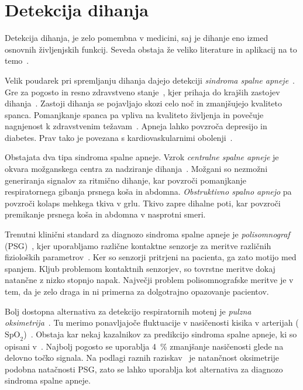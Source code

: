 \section{Detekcija dihanja}\label{sec:detekcija-dihanja}
Detekcija dihanja, je zelo pomembna v medicini, saj je dihanje eno izmed osnovnih življenjskih funkcij. Seveda obstaja že veliko literature in aplikacij na to temo~\cite{sathyanarayana2015vision}.

Velik poudarek pri spremljanju dihanja dajejo detekciji  \emph{sindroma spalne apneje}~\cite{sathyanarayana2015vision}. Gre za pogosto in resno zdravstveno stanje~\cite{wang2006vision}, kjer prihaja do krajših zastojev dihanja~\cite{flemons2002obstructive}. Zastoji dihanja se pojavljajo skozi celo noč in zmanjšujejo kvaliteto spanca. Pomanjkanje spanca pa vpliva na kvaliteto življenja in povečuje nagnjenost k zdravstvenim težavam~\cite{malhotra2002obstructive}. Apneja lahko povzroča depresijo in diabetes. Prav tako je povezana s kardiovaskularnimi obolenji~\cite{takemura2005respiratory}.

Obstajata dva tipa sindroma spalne apneje. Vzrok \emph{centralne spalne apneje} je okvara možganskega centra za nadziranje dihanja~\cite{javaheri2010central}. Možgani so nezmožni generiranja signalov za ritmično dihanje, kar povzroči pomanjkanje respiratornega gibanja prsnega koša in abdomna. \emph{Obstruktivno spalno apnejo} pa povzroči kolaps mehkega tkiva v grlu. Tkivo zapre dihalne poti, kar povzroči premikanje prsnega koša in abdomna v nasprotni smeri.

Trenutni klinični standard za diagnozo sindroma spalne apneje je \emph{polisomnograf} (PSG)~\cite{collop2007clinical}, kjer uporabljamo različne kontaktne senzorje za meritve različnih fizioloških parametrov~\cite{heinrich2015video}. Ker so senzorji pritrjeni na pacienta, ga zato motijo med spanjem. Kljub problemom kontaktnih senzorjev, so tovrstne meritve dokaj natančne z nizko stopnjo napak. Največji problem polisomnografske meritve je v tem, da je zelo draga in ni primerna za dolgotrajno opazovanje pacientov.

Bolj dostopna alternativa za detekcijo respiratornih motenj je \emph{pulzna oksimetrija}~\cite{netzer2001overnight}. Tu merimo ponavljajoče fluktuacije v nasičenosti kisika v arterijah ($\mathrm{SpO}_{2}$)~\cite{levy1996accuracy}. Obstaja kar nekaj kazalnikov za predikcijo sindroma spalne apneje, ki so opisani v~\cite{netzer2001overnight, magalang2003prediction}. Najbolj pogosto se uporablja \SI{4}{\%} zmanjšanje nasičenosti glede na delovno točko signala. Na podlagi raznih raziskav~\cite{cooper1991value,magalang2003prediction,netzer2001overnight,levy1996accuracy} je natančnost oksimetrije podobna natačnosti PSG, zato se lahko uporablja kot alternativa za diagnozo sindroma spalne apneje.

